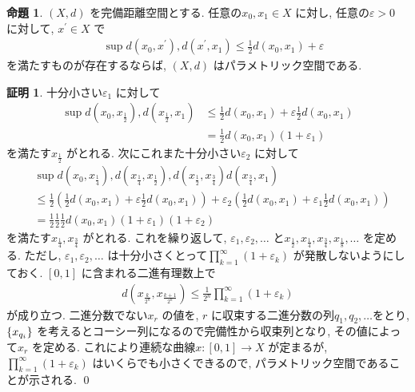 \documentclass[10pt, fleqn, label-section=none]{bxjsarticle}
\theoremstyle{definition}
\newtheorem{prop}[dfn]{命題}
\newtheorem*{pf*}{証明}
\newcommand{\veps}{\varepsilon}
\newcommand{\cbra}[1]{\mleft\{#1\mright\}}
\renewcommand{\;}{\, ; \,}
\begin{document}
\begin{prop}$(X, d)$ を完備距離空間とする. 任意の$x_0, x_1 \in X$ に対し, 任意の$\veps > 0$ に対して, $x^\prime \in X$ で
\begin{align*} \quad  \sup{ d(x_0 ,  x^\prime) , d(x^\prime , x_1)} \leq \frac{1}{2} d(x_0, x_1) + \veps \end{align*}
 を満たすものが存在するならば, $(X, d)$ はパラメトリック空間である. 
\end{prop}
\begin{pf*}
十分小さい$\veps_1$ に対して
\begin{align*}  \sup{ d(x_0 ,  x_{\frac{1}{2}}     ) , d(x_{\frac{1}{2}}  , x_1)}    & \leq \frac{1}{2} d(x_0, x_1) + \veps \frac{1}{2} d(x_0, x_1)  \\
&= \frac{1}{2} d(x_0, x_1)  (1 + \veps_1) \end{align*}
を満たす$x_{\frac{1}{2}} $ がとれる. 次にこれまた十分小さい$\veps_2$ に対して
\begin{align*} & \sup{ d(x_0 ,  x_{\frac{1}{4}} ) , d(x_{\frac{1}{4}}, x_{\frac{1}{2}}  ), d(x_{\frac{1}{2}}, x_{\frac{3}{4}} ) d(x_{\frac{3}{4}}  , x_1)}     \\
& \leq \frac{1}{2}( \frac{1}{2} d(x_0, x_1)  + \veps \frac{1}{2}d(x_0, x_1)  ) + \veps_2 (\frac{1}{2} d(x_0, x_1)  + \veps_1 \frac{1}{2} d(x_0, x_1) ) \\
&= \frac{1}{2}\frac{1}{2}\frac{1}{2} d(x_0, x_1)  (1 + \veps _1) (1 + \veps_2) \end{align*}
を満たす$x_{\frac{1}{4}} , x_{\frac{3}{4}}$ がとれる. これを繰り返して, $\veps_1, \veps_2, \ldots $ と$x_{\frac{1}{2}} , x_{\frac{1}{4}}, x_{\frac{3}{4}}, x_{\frac{1}{8}} , \ldots   $ を定める. ただし, $\veps_1, \veps_2, \ldots $ は十分小さくとって$\prod _{k = 1}^\infty (1 + \veps_k) $ が発散しないようにしておく. 
$[0, 1]$ に含まれる二進有理数上で
\begin{align*} d(x_{\frac{k}{2^n}} , x_{\frac{k + 1}{2^n} } ) \leq \frac{1}{2^n} \prod _{k = 1}^\infty (1 + \veps_k) \end{align*}
が成り立つ. 二進分数でない$x_r$ の値を, $r$ に収束する二進分数の列$q_1, q_2, \ldots $をとり, $\cbra{x_{q_i}}$ を考えるとコーシー列になるので完備性から収束列となり, その値によって$x_r$ を定める. これにより連続な曲線$x: [0,1] \rightarrow X$ が定まるが,  $\prod _{k = 1}^\infty (1 + \veps_k) $ はいくらでも小さくできるので, パラメトリック空間であることが示される. 
\qed
\end{pf*}
\end{document}
